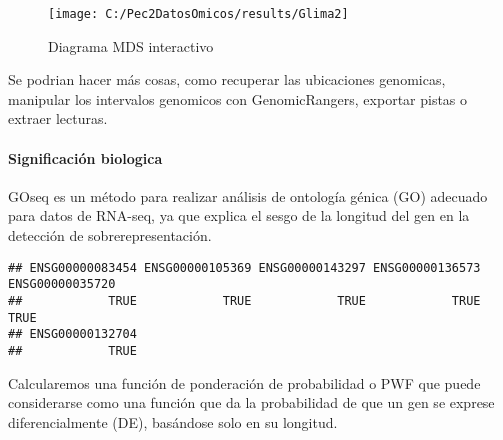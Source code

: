 \documentclass[
]{article}
\newenvironment{Shaded}{\begin{snugshade}}{\end{snugshade}}
\newcommand{\CommentTok}[1]{\textcolor[rgb]{0.56,0.35,0.01}{\textit{#1}}}
\newcommand{\FloatTok}[1]{\textcolor[rgb]{0.00,0.00,0.81}{#1}}
\newcommand{\KeywordTok}[1]{\textcolor[rgb]{0.13,0.29,0.53}{\textbf{#1}}}
\newcommand{\NormalTok}[1]{#1}
\newcommand{\OperatorTok}[1]{\textcolor[rgb]{0.81,0.36,0.00}{\textbf{#1}}}
\newcommand{\StringTok}[1]{\textcolor[rgb]{0.31,0.60,0.02}{#1}}
\begin{document}
\begin{figure}
\texttt{[image: C:/Pec2DatosOmicos/results/Glima2]} \caption{Diagrama MDS interactivo}\label{fig:unnamed-chunk-46}
\end{figure}

Se podrian hacer más cosas, como recuperar las ubicaciones genomicas,
manipular los intervalos genomicos con GenomicRangers, exportar pistas o
extraer lecturas.

\hypertarget{significaciuxf3n-biologica}{%
\paragraph{Significación biologica}\label{significaciuxf3n-biologica}}

GOseq es un método para realizar análisis de ontología génica (GO)
adecuado para datos de RNA-seq, ya que explica el sesgo de la longitud
del gen en la detección de sobrerepresentación.

\begin{Shaded}
\end{Shaded}

\begin{verbatim}
## ENSG00000083454 ENSG00000105369 ENSG00000143297 ENSG00000136573 ENSG00000035720 
##            TRUE            TRUE            TRUE            TRUE            TRUE 
## ENSG00000132704 
##            TRUE
\end{verbatim}

Calcularemos una función de ponderación de probabilidad o PWF que puede
considerarse como una función que da la probabilidad de que un gen se
exprese diferencialmente (DE), basándose solo en su longitud.

\begin{Shaded}
\end{Shaded}
\end{document}
